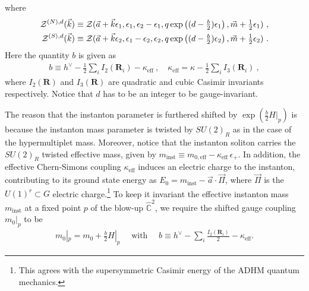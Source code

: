\documentclass[letterpaper, 11pt]{article}
\def\IC{\mathbb{C}}
\def\IP{\mathbb{P}}
\def\CO{{\cal O}}
\def\CZ{{\cal Z}}
\def\e{\epsilon}
\def\k{\kappa}
\def\half{\frac{1}{2}}
\begin{document}
where
\begin{align}
  \label{eq:param-np-sp5d}
\begin{split}
  \CZ^{(N),d}(\vec{k}) &\equiv \CZ(\vec{a}+\vec{k} \e_1, \e_1, \e_2-\e_1, q \exp \left((d - \tfrac{b}{2})\e_1 \right), \vec{m} +\tfrac{1}{2}\e_1) \ , \\
  \CZ^{(S),d}(\vec{k}) &\equiv \CZ(\vec{a}+\vec{k} \e_2, \e_1 - \e_2, \e_2, q \exp \left( (d - \tfrac{b}{2})\e_2\right), \vec{m} +\tfrac{1}{2}\e_2)\ . 
\end{split}
\end{align}
Here the quantity $b$ is given as 
\begin{align}
 b \equiv h^\vee - \frac{1}{2} \sum_i I_2(\mathbf{R}_i) - \kappa_{\textrm{eff}} \ , \quad \kappa_{\textrm{eff}} = \kappa - \half \sum_i I_3(\mathbf{R}_i) \ , 
\end{align}
where $I_2(\mathbf{R})$ and $I_3(\mathbf{R})$ are quadratic and cubic Casimir invariants respectively. 
Notice that $d$ has to be an integer to be gauge-invariant. 

The reason that the instanton parameter is furthered shifted by $\exp(\frac{b}{2} H|_p) $ is because the instanton mass parameter is twisted by $SU(2)_R$ as in the case of the hypermultiplet mass. 
Moreover, notice that the instanton soliton carries the $SU(2)_R$ twisted effective mass, given by $m_\text{inst} \equiv m_{0, \textrm{eff}} - \kappa_\text{eff}\,\e_+$.
In addition, the  effective Chern-Simons coupling $\k_{\textrm{eff}}$ induces an electric charge to the instanton, contributing to its ground state energy as $E_0 = m_\text{inst} - \vec{a} \cdot \vec{\Pi}$, where $\vec{\Pi}$ is the $U(1)^r \subset G$ electric charge.\footnote{This agrees with the supersymmetric Casimir energy of the ADHM quantum mechanics.} To keep it invariant the effective instanton mass $m_\text{inst}$ at a fixed point $p$ of the blow-up $\hat{\IC}^2$, we require the shifted gauge coupling $m_0|_p$  to be 
\begin{align}
  \label{eq:coupling-shift}
  m_0|_p = m_0 + \frac{b}{2}H|_p \quad \text{ with }\quad
  b \equiv h^{\vee}-\sum_i\frac{I_2(\boldsymbol{R}_i)}{2} - \kappa_\text{eff}.
\end{align}
\end{document}
